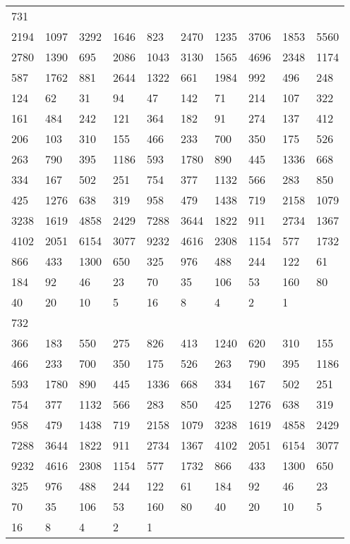 \begin{longtable}{*{10}{l}}
731&&&&&&&&&\\
2194& 1097& 3292& 1646& 823& 2470& 1235& 3706& 1853& 5560\\
2780& 1390& 695& 2086& 1043& 3130& 1565& 4696& 2348& 1174\\
587& 1762& 881& 2644& 1322& 661& 1984& 992& 496& 248\\
124& 62& 31& 94& 47& 142& 71& 214& 107& 322\\
161& 484& 242& 121& 364& 182& 91& 274& 137& 412\\
206& 103& 310& 155& 466& 233& 700& 350& 175& 526\\
263& 790& 395& 1186& 593& 1780& 890& 445& 1336& 668\\
334& 167& 502& 251& 754& 377& 1132& 566& 283& 850\\
425& 1276& 638& 319& 958& 479& 1438& 719& 2158& 1079\\
3238& 1619& 4858& 2429& 7288& 3644& 1822& 911& 2734& 1367\\
4102& 2051& 6154& 3077& 9232& 4616& 2308& 1154& 577& 1732\\
866& 433& 1300& 650& 325& 976& 488& 244& 122& 61\\
184& 92& 46& 23& 70& 35& 106& 53& 160& 80\\
40& 20& 10& 5& 16& 8& 4& 2& 1& \\

732&&&&&&&&&\\
366& 183& 550& 275& 826& 413& 1240& 620& 310& 155\\
466& 233& 700& 350& 175& 526& 263& 790& 395& 1186\\
593& 1780& 890& 445& 1336& 668& 334& 167& 502& 251\\
754& 377& 1132& 566& 283& 850& 425& 1276& 638& 319\\
958& 479& 1438& 719& 2158& 1079& 3238& 1619& 4858& 2429\\
7288& 3644& 1822& 911& 2734& 1367& 4102& 2051& 6154& 3077\\
9232& 4616& 2308& 1154& 577& 1732& 866& 433& 1300& 650\\
325& 976& 488& 244& 122& 61& 184& 92& 46& 23\\
70& 35& 106& 53& 160& 80& 40& 20& 10& 5\\
16& 8& 4& 2& 1& \\


\end{longtable}
